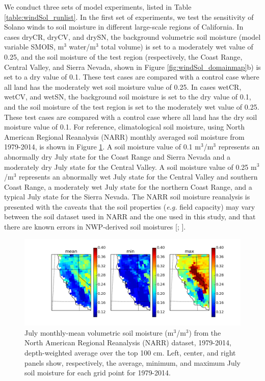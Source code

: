 We conduct three sets of model experiments, listed in Table \ref{table:windSol_runlist}.  In the first set of experiments, we test the sensitivity of Solano winds to soil moisture in different large-scale regions of California.  In cases dryCR, dryCV, and drySN, the background volumetric soil moisture (model variable SMOIS, m$^3$ water/m$^3$ total volume) is set to a moderately wet value of 0.25, and the soil moisture of the test region (respectively, the Coast Range, Central Valley, and Sierra Nevada, shown in Figure \ref{fig:windSol_domainmap}b) is set to a dry value of 0.1.  These test cases are compared with a control case where all land has the moderately wet soil moisture value of 0.25.  In cases wetCR, wetCV, and wetSN, the background soil moisture is set to the dry value of 0.1, and the soil moisture of the test region is set to the moderately wet value of 0.25.  These test cases are compared with a control case where all land has the dry soil moisture value of 0.1.  For reference, climatological soil moisture, using North American Regional Reanalysis (NARR) monthly averaged soil moisture from 1979-2014, is shown in Figure \ref{fig:windSol_NARR_smois}.  A soil moisture value of 0.1 m$^3$/m$^3$  represents an abnormally dry July state for the Coast Range and Sierra Nevada and a moderately dry July state for the Central Valley.  A soil moisture value of 0.25 m$^3$/m$^3$  represents an abnormally wet July state for the Central Valley and southern Coast Range, a moderately wet July state for the northern Coast Range, and a typical July state for the Sierra Nevada.  The NARR soil moisture reanalysis is presented with the caveats that the soil properties (\textit{e.g.} field capacity) may vary between the soil dataset used in NARR and the one used in this study, and that there are known errors in NWP-derived soil moistures [\cite{marshall2003impact}; \cite{godfrey2008soil}].

\begin{figure}[here]
\includegraphics[width=1\textwidth]{ch3-wind/img/NARR_smois_maps_3.png}
\caption{July monthly-mean volumetric soil moisture (m$^3$/m$^3$) from the North American Regional Reanalysis (NARR) dataset, 1979-2014, depth-weighted average over the top 100 cm.  Left, center, and right panels show, respectively, the average, minimum, and maximum July soil moisture for each grid point for 1979-2014.}
\label{fig:windSol_NARR_smois}
\end{figure}

